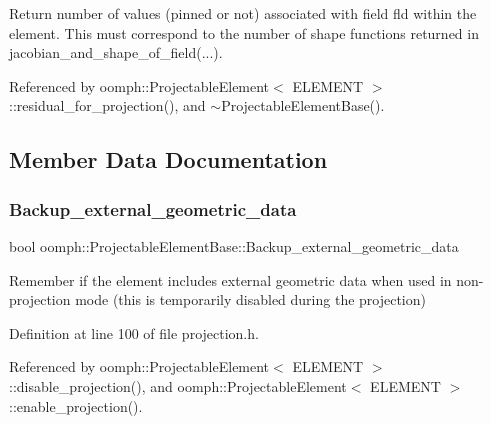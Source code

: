 Return number of values (pinned or not) associated with field fld within the element. This must correspond to the number of shape functions returned in jacobian\+\_\+and\+\_\+shape\+\_\+of\+\_\+field(...). 



Referenced by oomph\+::\+Projectable\+Element$<$ E\+L\+E\+M\+E\+N\+T $>$\+::residual\+\_\+for\+\_\+projection(), and $\sim$\+Projectable\+Element\+Base().



\subsection{Member Data Documentation}
\mbox{\label{classoomph_1_1ProjectableElementBase_a907f0491ccf46f64e97365afc2fcb773}} 
\subsubsection{\texorpdfstring{Backup\+\_\+external\+\_\+geometric\+\_\+data}{Backup\_external\_geometric\_data}}
{\footnotesize\ttfamily bool oomph\+::\+Projectable\+Element\+Base\+::\+Backup\+\_\+external\+\_\+geometric\+\_\+data\hspace{0.3cm}{\ttfamily [protected]}}



Remember if the element includes external geometric data when used in non-\/projection mode (this is temporarily disabled during the projection) 



Definition at line 100 of file projection.\+h.



Referenced by oomph\+::\+Projectable\+Element$<$ E\+L\+E\+M\+E\+N\+T $>$\+::disable\+\_\+projection(), and oomph\+::\+Projectable\+Element$<$ E\+L\+E\+M\+E\+N\+T $>$\+::enable\+\_\+projection().

\mbox{\label{classoomph_1_1ProjectableElementBase_a0f9195c254f229b178a8844f2572c7d4}} 
